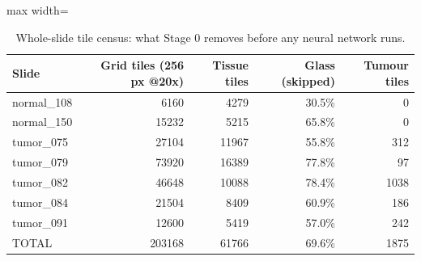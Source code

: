 \begin{table}[H]\centering\small
\caption{Whole-slide tile census: what Stage 0 removes before any neural network runs.}\label{tab:census}
\begin{adjustbox}{max width=\linewidth}\begin{tabular}{lrrrr}\toprule
\textbf{Slide} & \textbf{Grid tiles (256 px @20x)} & \textbf{Tissue tiles} & \textbf{Glass (skipped)} & \textbf{Tumour tiles} \\\midrule
normal\_108 & 6160 & 4279 & 30.5\% & 0 \\
normal\_150 & 15232 & 5215 & 65.8\% & 0 \\
tumor\_075 & 27104 & 11967 & 55.8\% & 312 \\
tumor\_079 & 73920 & 16389 & 77.8\% & 97 \\
tumor\_082 & 46648 & 10088 & 78.4\% & 1038 \\
tumor\_084 & 21504 & 8409 & 60.9\% & 186 \\
tumor\_091 & 12600 & 5419 & 57.0\% & 242 \\
TOTAL & 203168 & 61766 & 69.6\% & 1875 \\
\bottomrule\end{tabular}\end{adjustbox}\end{table}